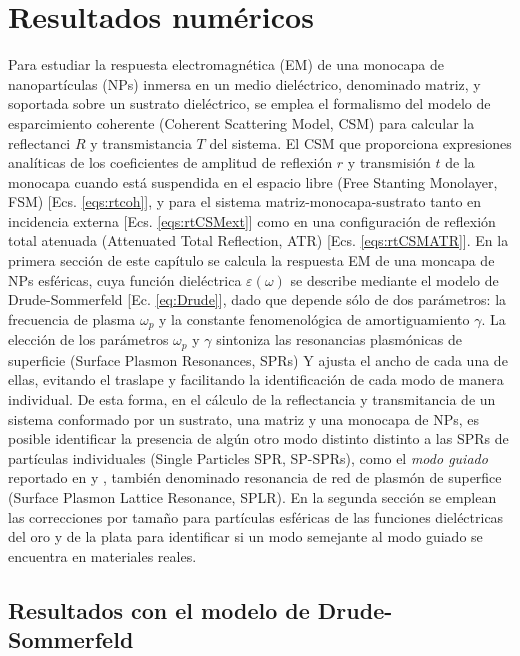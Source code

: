 \chapter{Resultados numéricos}

Para estudiar la respuesta electromagnética (EM) de una monocapa de nanopartículas (NPs) inmersa en un medio dieléctrico, denominado matriz, y soportada sobre un sustrato dieléctrico, se emplea el formalismo del modelo de esparcimiento coherente (Coherent Scattering Model, CSM) para calcular la reflectanci $R$ y transmistancia $T$ del sistema. El CSM que proporciona expresiones analíticas de los coeficientes de amplitud de reflexión $r$ y transmisión $t$ de la monocapa cuando está suspendida en el espacio libre (Free Stanting Monolayer, FSM) [Ecs. \eqref{eqs:rtcoh}], y para el sistema matriz-monocapa-sustrato tanto en incidencia externa [Ecs. \eqref{eqs:rtCSMext}] como en una configuración de reflexión total atenuada  (Attenuated Total Reflection, ATR) [Ecs. \eqref{eqs:rtCSMATR}]. En la primera sección de este capítulo se calcula la respuesta EM de una moncapa de NPs esféricas, cuya  función dieléctrica $\varepsilon(\omega)$ se describe mediante el modelo de Drude-Sommerfeld [Ec. \eqref{eq:Drude}], dado que depende sólo de dos parámetros: la frecuencia de plasma $\omega_p$ y la constante fenomenológica de amortiguamiento $\gamma$. La elección de los parámetros $\omega_p$ y $\gamma$ sintoniza las resonancias plasmónicas de superficie (Surface Plasmon Resonances, SPRs) Y ajusta el ancho de cada una de ellas, evitando el traslape y facilitando la identificación de cada modo de manera individual. De esta forma, en el cálculo de la reflectancia y transmitancia de un sistema conformado por un sustrato, una matriz y una monocapa de NPs, es posible identificar la presencia de algún otro modo  distinto distinto a las SPRs de partículas individuales (Single Particles SPR, SP-SPRs), como el \emph{modo guiado} reportado en \cite{kabashin2009plasmonic} y \cite{danilov2018ultra}, también denominado resonancia de red de plasmón de superfice (Surface Plasmon Lattice Resonance, SPLR). En la segunda sección se emplean las correcciones por tamaño para partículas esféricas de las funciones dieléctricas del oro y de la plata para identificar si un modo semejante al modo guiado se encuentra en materiales reales.

\section{Resultados con el modelo de Drude-Sommerfeld}
\label{section:Drude}


